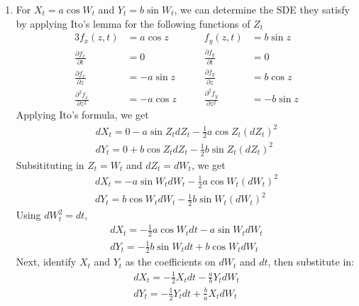 \documentclass[12pt]{article}
\theoremstyle{plain}
\theoremstyle{definition}
\theoremstyle{remark}
\begin{document}
\begin{enumerate}
\begin{enumerate}
      \item %
        For $X_t = a \cos W_t$ and $Y_t = b \sin W_t$, we can determine
        the SDE they satisfy by applying Ito's lemma for the following
        functions of $Z_t$
        \begin{alignat*}{3}
          f_x(z,t) &= a\cos z \qquad & f_y(z,t) &= b \sin z \\
          \frac{\partial f_x}{\partial t}
            &= 0
            \qquad &
          \frac{\partial f_y}{\partial t}
            &= 0 \\
          \frac{\partial f_x}{\partial z}
            &= -a\sin z
            \qquad &
          \frac{\partial f_y}{\partial z}
            &= b\cos z \\
          \frac{\partial^2 f_x}{\partial z^2}
            &= -a\cos z
            \qquad &
          \frac{\partial^2 f_y}{\partial z^2}
            &= -b\sin z
        \end{alignat*}
        Applying Ito's formula, we get
        \begin{align*}
          dX_t = 0 - a \sin Z_t dZ_t - \frac{1}{2} a\cos Z_t (dZ_t)^2\\
          dY_t = 0 + b \cos Z_t dZ_t - \frac{1}{2} b\sin Z_t (dZ_t)^2
        \end{align*}
        Subsitituting in $Z_t = W_t$ and $dZ_t = dW_t$, we get
        \begin{align*}
          dX_t = - a \sin W_t dW_t - \frac{1}{2} a\cos W_t (dW_t)^2\\
          dY_t =   b \cos W_t dW_t - \frac{1}{2} b\sin W_t (dW_t)^2
        \end{align*}
        Using $dW_t^2 = dt$,
        \begin{align*}
          dX_t = - \frac{1}{2} a\cos W_t dt - a \sin W_t dW_t  \\
          dY_t = - \frac{1}{2} b\sin W_t dt + b \cos W_t dW_t
        \end{align*}
        Next, identify $X_t$ and $Y_t$ as the coefficients on $dW_t$ and
        $dt$, then substitute in:
        \begin{align*}
          dX_t = - \frac{1}{2} X_t dt - \frac{a}{b} Y_t dW_t  \\
          dY_t = - \frac{1}{2} Y_t dt + \frac{b}{a} X_t dW_t
        \end{align*}

    \end{enumerate}

\end{enumerate}
\end{document}
